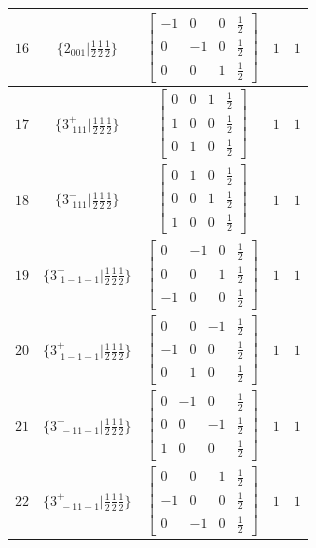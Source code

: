 \documentclass[fleqn,8pt]{jsarticle}
\begin{document}
\begin{longtable}{ccccc}
$ 16 $ & $ \{2{}_{001}|\frac{1}{2} \frac{1}{2} \frac{1}{2}\} $ & $ \begin{bmatrix} -1 & 0 & 0 & \frac{1}{2} \\ 0 & -1 & 0 & \frac{1}{2} \\ 0 & 0 & 1 & \frac{1}{2} \end{bmatrix} $ & $ 1 $ & $ 1 $ \\ \hline
$ 17 $ & $ \{3^{+}_{\,\,111}|\frac{1}{2} \frac{1}{2} \frac{1}{2}\} $ & $ \begin{bmatrix} 0 & 0 & 1 & \frac{1}{2} \\ 1 & 0 & 0 & \frac{1}{2} \\ 0 & 1 & 0 & \frac{1}{2} \end{bmatrix} $ & $ 1 $ & $ 1 $ \\ \hline
$ 18 $ & $ \{3^{-}_{\,\,111}|\frac{1}{2} \frac{1}{2} \frac{1}{2}\} $ & $ \begin{bmatrix} 0 & 1 & 0 & \frac{1}{2} \\ 0 & 0 & 1 & \frac{1}{2} \\ 1 & 0 & 0 & \frac{1}{2} \end{bmatrix} $ & $ 1 $ & $ 1 $ \\ \hline
$ 19 $ & $ \{3^{-}_{\,\,1-1-1}|\frac{1}{2} \frac{1}{2} \frac{1}{2}\} $ & $ \begin{bmatrix} 0 & -1 & 0 & \frac{1}{2} \\ 0 & 0 & 1 & \frac{1}{2} \\ -1 & 0 & 0 & \frac{1}{2} \end{bmatrix} $ & $ 1 $ & $ 1 $ \\ \hline
$ 20 $ & $ \{3^{+}_{\,\,1-1-1}|\frac{1}{2} \frac{1}{2} \frac{1}{2}\} $ & $ \begin{bmatrix} 0 & 0 & -1 & \frac{1}{2} \\ -1 & 0 & 0 & \frac{1}{2} \\ 0 & 1 & 0 & \frac{1}{2} \end{bmatrix} $ & $ 1 $ & $ 1 $ \\ \hline
$ 21 $ & $ \{3^{-}_{\,\,-11-1}|\frac{1}{2} \frac{1}{2} \frac{1}{2}\} $ & $ \begin{bmatrix} 0 & -1 & 0 & \frac{1}{2} \\ 0 & 0 & -1 & \frac{1}{2} \\ 1 & 0 & 0 & \frac{1}{2} \end{bmatrix} $ & $ 1 $ & $ 1 $ \\ \hline
$ 22 $ & $ \{3^{+}_{\,\,-11-1}|\frac{1}{2} \frac{1}{2} \frac{1}{2}\} $ & $ \begin{bmatrix} 0 & 0 & 1 & \frac{1}{2} \\ -1 & 0 & 0 & \frac{1}{2} \\ 0 & -1 & 0 & \frac{1}{2} \end{bmatrix} $ & $ 1 $ & $ 1 $ \\ \hline

\end{longtable}
\end{document}
